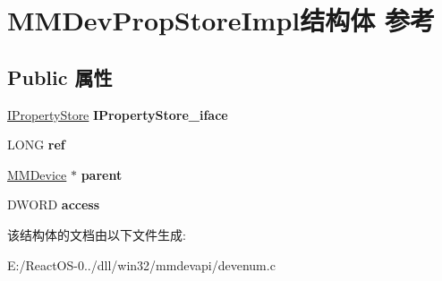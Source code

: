 \hypertarget{struct_m_m_dev_prop_store_impl}{}\section{M\+M\+Dev\+Prop\+Store\+Impl结构体 参考}
\label{struct_m_m_dev_prop_store_impl}
\subsection*{Public 属性}
\begin{DoxyCompactItemize}
\item 
\mbox{\label{struct_m_m_dev_prop_store_impl_a6b304613e650f1aa201c7af7218bd99c}} 
\hyperlink{interface_i_property_store}{I\+Property\+Store} {\bfseries I\+Property\+Store\+\_\+iface}
\item 
\mbox{\label{struct_m_m_dev_prop_store_impl_a03ff6ecd41bae72bcae923eea55aa5f7}} 
L\+O\+NG {\bfseries ref}
\item 
\mbox{\label{struct_m_m_dev_prop_store_impl_ab8ee4fc17d20c6b3a039d7b10c3247ad}} 
\hyperlink{struct_m_m_device}{M\+M\+Device} $\ast$ {\bfseries parent}
\item 
\mbox{\label{struct_m_m_dev_prop_store_impl_ac9cbd29f9285fa5cd90c3c4895366fe3}} 
D\+W\+O\+RD {\bfseries access}
\end{DoxyCompactItemize}


该结构体的文档由以下文件生成\+:\begin{DoxyCompactItemize}
\item 
E\+:/\+React\+O\+S-\/0../dll/win32/mmdevapi/devenum.\+c\end{DoxyCompactItemize}
